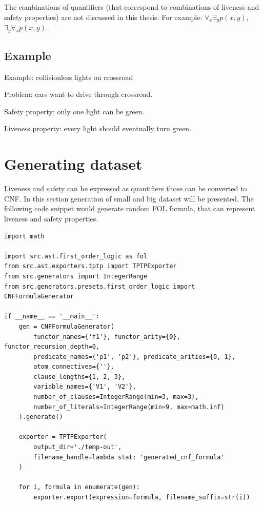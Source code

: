 The combinations of quantifiers (that correspond to combinations of liveness and safety properties) are not discussed in this thesis. For example: $\forall_x \exists_y p(x, y)$, $\exists_y \forall_x p(x, y)$.

\subsection{Example}

Example: collisionless lights on crossroad

\noindent
Problem: cars want to drive through crossroad.

\noindent
Safety property: only one light can be green.

\noindent
Liveness property: every light should eventually turn green.

\section{Generating dataset}

Liveness and safety can be expressed as quantifiers those can be converted to CNF. In this section generation of small and big dataset will be presented.
The following code snippet would generate random \gls{FOL} formula, that can represent liveness and safety properties.

\begin{verbatim}
import math

import src.ast.first_order_logic as fol
from src.ast.exporters.tptp import TPTPExporter
from src.generators import IntegerRange
from src.generators.presets.first_order_logic import CNFFormulaGenerator

if __name__ == '__main__':
    gen = CNFFormulaGenerator(
        functor_names={'f1'}, functor_arity={0}, functor_recursion_depth=0,
        predicate_names={'p1', 'p2'}, predicate_arities={0, 1},
        atom_connectives={''},
        clause_lengths={1, 2, 3},
        variable_names={'V1', 'V2'},
        number_of_clauses=IntegerRange(min=3, max=3),
        number_of_literals=IntegerRange(min=9, max=math.inf)
    ).generate()

    exporter = TPTPExporter(
        output_dir='./temp-out',
        filename_handle=lambda stat: 'generated_cnf_formula'
    )

    for i, formula in enumerate(gen):
        exporter.export(expression=formula, filename_suffix=str(i))
\end{verbatim}

